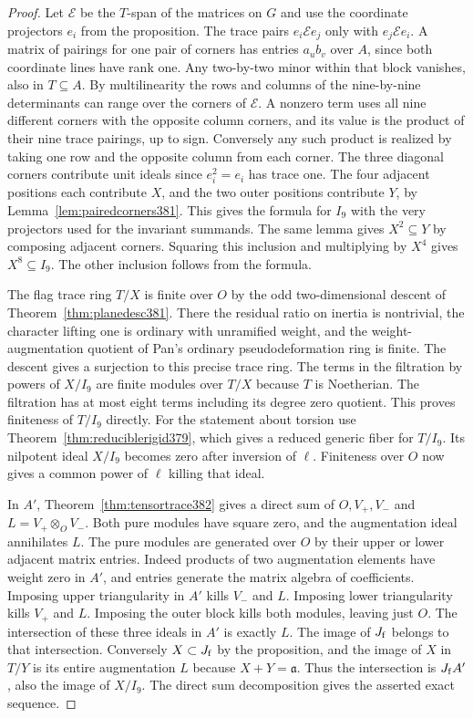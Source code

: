 \documentclass[a4paper,11pt]{article}
\theoremstyle{definition}
\theoremstyle{remark}
\numberwithin{equation}{section}
\begin{document}
\begin{proof}
Let \(\mathcal E\) be the \(T\)-span of the matrices on \(G\)
and use the coordinate projectors \(e_i\) from the proposition.
The trace pairs \(e_i\mathcal E e_j\) only with
\(e_j\mathcal E e_i\). A matrix of pairings for one pair of
corners has entries \(a_u b_v\) over \(A\), since both
coordinate lines have rank one. Any two-by-two minor within
that block vanishes, also in \(T\subseteq A\). By multilinearity
the rows and columns of the nine-by-nine determinants can
range over the corners of \(\mathcal E\). A nonzero term uses
all nine different corners with the opposite column corners,
and its value is the product of their nine trace pairings,
up to sign. Conversely any such product is realized by taking
one row and the opposite column from each corner. The three
diagonal corners contribute unit ideals since \(e_i^2=e_i\)
has trace one. The four adjacent positions each contribute
\(X\), and the two outer positions contribute \(Y\), by
Lemma~\ref{lem:pairedcorners381}. This gives the formula for
\(I_9\) with the very projectors used for the invariant summands.
The same lemma gives \(X^2\subseteq Y\) by composing adjacent
corners. Squaring this inclusion and multiplying by \(X^4\)
gives \(X^8\subseteq I_9\). The other inclusion follows from
the formula.

The flag trace ring \(T/X\) is finite over \(O\) by the odd
two-dimensional descent of Theorem~\ref{thm:planedesc381}.
There the residual ratio on inertia is nontrivial, the character
lifting one is ordinary with unramified weight, and the
weight-augmentation quotient of Pan's ordinary pseudodeformation
ring is finite. The descent gives a surjection to this precise
trace ring. The terms in the filtration by powers of \(X/I_9\)
are finite modules over \(T/X\) because \(T\) is Noetherian.
The filtration has at most eight terms including its degree
zero quotient. This proves finiteness of \(T/I_9\) directly.
For the statement about torsion use
Theorem~\ref{thm:reduciblerigid379}, which gives a reduced
generic fiber for \(T/I_9\). Its nilpotent ideal \(X/I_9\)
becomes zero after inversion of \(\ell\). Finiteness over
\(O\) now gives a common power of \(\ell\) killing that ideal.

In \(A'\), Theorem~\ref{thm:tensortrace382}
gives a direct sum of \(O,V_+,V_-\)
and \(L=V_+\otimes_O V_-\). Both pure modules have square zero,
and the augmentation ideal annihilates \(L\).
The pure modules are generated over \(O\) by their upper or
lower adjacent matrix entries. Indeed products of two
augmentation elements have weight zero in \(A'\), and entries
generate the matrix algebra of coefficients. Imposing upper
triangularity in \(A'\) kills \(V_-\) and \(L\). Imposing
lower triangularity kills \(V_+\) and \(L\). Imposing the
outer block kills both modules, leaving just \(O\). The
intersection of these three ideals in \(A'\) is exactly \(L\).
The image of \(J_{\rm f}\) belongs to that intersection.
Conversely \(X\subset J_{\rm f}\) by the proposition, and
the image of \(X\) in \(T/Y\) is its entire augmentation \(L\)
because \(X+Y=\mathfrak a\). Thus the intersection is
\(J_{\rm f}A'\), also the image of \(X/I_9\). The direct sum
decomposition gives the asserted exact sequence.
\end{proof}
\end{document}
